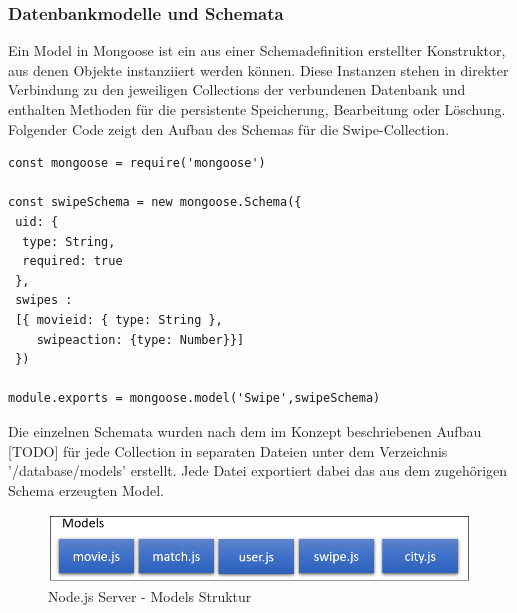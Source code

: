 \subsubsection{Datenbankmodelle und Schemata}

Ein Model in Mongoose ist ein aus einer Schemadefinition erstellter Konstruktor, aus denen Objekte instanziiert werden können. Diese Instanzen stehen in direkter Verbindung zu den jeweiligen Collections der verbundenen Datenbank und enthalten Methoden für die persistente Speicherung, Bearbeitung oder Löschung.
\newline
Folgender Code zeigt den Aufbau des Schemas für die Swipe-Collection. 

\begin{lstlisting}[caption=Swipe Schema und Model, label=lst:modelswipe]
const mongoose = require('mongoose')

const swipeSchema = new mongoose.Schema({
 uid: {
  type: String,
  required: true
 },
 swipes :
 [{ movieid: { type: String },
    swipeaction: {type: Number}}]
 })

module.exports = mongoose.model('Swipe',swipeSchema)
\end{lstlisting}

\noindent
Die einzelnen Schemata wurden nach dem im Konzept beschriebenen Aufbau [TODO] für jede Collection in separaten Dateien unter dem Verzeichnis '/database/models' erstellt. Jede Datei exportiert dabei das aus dem zugehörigen Schema erzeugten Model.

\begin{figure}[h]
\centering
\includegraphics[width=12cm]{images/modelsstruktur.PNG}
\caption{Node.js Server - Models Struktur}
\end{figure}

